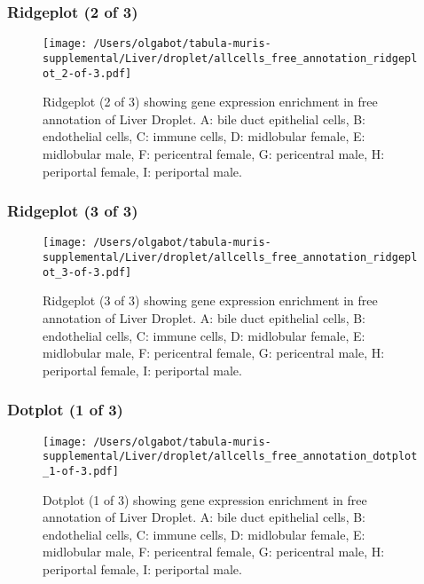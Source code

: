 \clearpage
\clearpage
\subsubsection{Ridgeplot (2 of 3)}
\begin{figure}[h]
\centering
\texttt{[image: /Users/olgabot/tabula-muris-supplemental/Liver/droplet/allcells\_free\_annotation\_ridgeplot\_2-of-3.pdf]}

\caption{ Ridgeplot (2 of 3)  showing gene expression enrichment in free annotation of Liver Droplet. A: bile duct epithelial cells, B: endothelial cells, C: immune cells, D: midlobular female, E: midlobular male, F: pericentral female, G: pericentral male, H: periportal female, I: periportal male.}
\end{figure}


\clearpage
\clearpage
\subsubsection{Ridgeplot (3 of 3)}
\begin{figure}[h]
\centering
\texttt{[image: /Users/olgabot/tabula-muris-supplemental/Liver/droplet/allcells\_free\_annotation\_ridgeplot\_3-of-3.pdf]}

\caption{ Ridgeplot (3 of 3)  showing gene expression enrichment in free annotation of Liver Droplet. A: bile duct epithelial cells, B: endothelial cells, C: immune cells, D: midlobular female, E: midlobular male, F: pericentral female, G: pericentral male, H: periportal female, I: periportal male.}
\end{figure}


\clearpage
\clearpage
\subsubsection{Dotplot (1 of 3)}
\begin{figure}[h]
\centering
\texttt{[image: /Users/olgabot/tabula-muris-supplemental/Liver/droplet/allcells\_free\_annotation\_dotplot\_1-of-3.pdf]}

\caption{ Dotplot (1 of 3)  showing gene expression enrichment in free annotation of Liver Droplet. A: bile duct epithelial cells, B: endothelial cells, C: immune cells, D: midlobular female, E: midlobular male, F: pericentral female, G: pericentral male, H: periportal female, I: periportal male.}
\end{figure}


\clearpage
\clearpage
